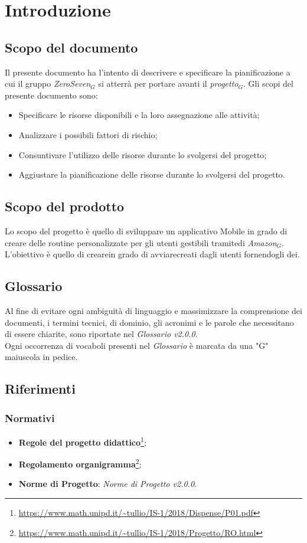 \chapter{Introduzione}\label{Introduzione}
\section{Scopo del documento}
Il presente documento ha l'intento di descrivere e specificare la pianificazione a cui il gruppo \textit{ZeroSeven$_{G}$} si atterrà per portare avanti il \textit{progetto$_{G}$}.
Gli scopi del presente documento sono:
\begin{itemize}
	\item Specificare le risorse disponibili e la loro assegnazione alle attività;
	\item Analizzare i possibili fattori di rischio;
	\item Consuntivare l'utilizzo delle risorse durante lo svolgersi del progetto;
	\item Aggiustare la pianificazione delle risorse durante lo svolgersi del progetto.
\end{itemize}
\section{Scopo del prodotto}
Lo scopo del progetto è quello di sviluppare un applicativo Mobile in grado di creare delle routine personalizzate per gli utenti gestibili tramitedi \textit{Amazon$_{G}$}. L'obiettivo è quello di crearein grado di avviarecreati dagli utenti fornendogli dei.
\section{Glossario}
Al fine di evitare ogni ambiguità di linguaggio e massimizzare la comprensione dei documenti, i termini tecnici, di dominio, gli acronimi e le parole che necessitano di essere chiarite, sono riportate nel \textit{Glossario v2.0.0}.\\
Ogni occorrenza di vocaboli presenti nel \textit{Glossario} è marcata da una "G" maiuscola in pedice.
\section{Riferimenti}
\subsection{Normativi}
\label{normativi}
\begin{itemize}
	\item \textbf{Regole del progetto didattico}\footnote{\url{https://www.math.unipd.it/~tullio/IS-1/2018/Dispense/P01.pdf}};
	\item  \textbf{Regolamento organigramma}\footnote{\url{https://www.math.unipd.it/~tullio/IS-1/2018/Progetto/RO.html}};
	\item  \textbf{Norme di Progetto}: \textit{Norme di Progetto v2.0.0}.
\end{itemize}
